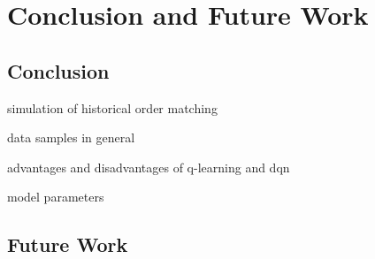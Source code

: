 \chapter{Conclusion and Future Work}
\label{chap:conclusion}

\section{Conclusion}
simulation of historical order matching

data samples in general

advantages and disadvantages of q-learning and dqn

model parameters

\section{Future Work}